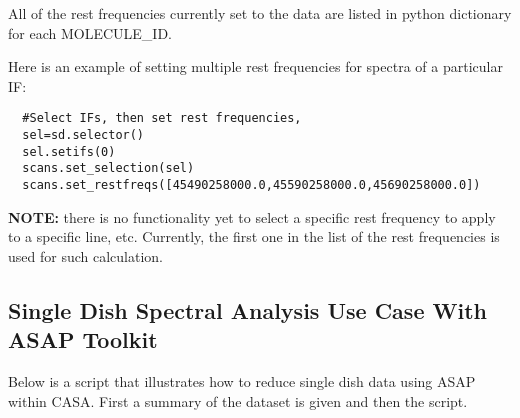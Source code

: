 All of the rest frequencies currently set to the data are listed in
python dictionary for each MOLECULE\_ID.

Here is an example of setting multiple rest frequencies for spectra of a particular IF:

\small
\begin{verbatim}
  #Select IFs, then set rest frequencies,
  sel=sd.selector()
  sel.setifs(0)
  scans.set_selection(sel)
  scans.set_restfreqs([45490258000.0,45590258000.0,45690258000.0])
\end{verbatim}
\normalsize

{\bf NOTE:} there is no functionality yet to select a specific rest frequency 
to apply to a specific line, etc. Currently, the first one in the list
of the rest frequencies is used for such calculation.

 
\subsection{Single Dish Spectral Analysis Use Case With ASAP Toolkit}
\label{subsection:sd.asap.usecase}

Below is a script that illustrates how to reduce single dish data
using ASAP within CASA.  First a summary of the dataset is given and
then the script.

